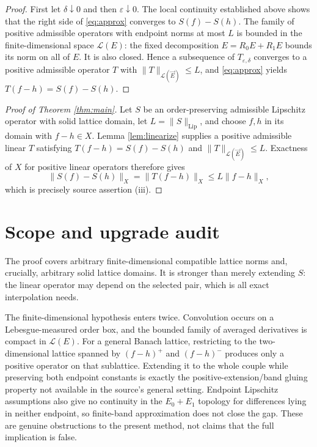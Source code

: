 \documentclass[11pt]{article}
\newcommand{\cL}{\mathcal L}
\begin{document}
\begin{proof}
First let $\delta\downarrow0$ and then $\varepsilon\downarrow0$.  The local
continuity established above shows that the right side of
\eqref{eq:approx} converges to $S(f)-S(h)$.  The family of positive
admissible operators with endpoint norms at most $L$ is bounded in the
finite-dimensional space $\cL(E)$: the fixed decomposition
$E=R_0E+R_1E$ bounds its norm on all of $E$.  It is also closed.  Hence a
subsequence of $T_{\varepsilon,\delta}$ converges to a positive admissible
operator $T$ with $\|T\|_{\cL(\vec E)}\le L$, and \eqref{eq:approx} yields
$T(f-h)=S(f)-S(h)$.
\end{proof}

\begin{proof}[Proof of Theorem \ref{thm:main}]
Let $S$ be an order-preserving admissible Lipschitz operator with solid
lattice domain, let $L=\|S\|_{\mathrm{Lip}}$, and choose $f,h$ in its domain
with $f-h\in X$.  Lemma \ref{lem:linearize} supplies a positive admissible
linear $T$ satisfying $T(f-h)=S(f)-S(h)$ and
$\|T\|_{\cL(\vec E)}\le L$.  Exactness of $X$ for positive linear operators
therefore gives
\[
 \|S(f)-S(h)\|_X
 =\|T(f-h)\|_X
 \le L\|f-h\|_X,
\]
which is precisely source assertion (iii).
\end{proof}

\section{Scope and upgrade audit}

The proof covers arbitrary finite-dimensional compatible lattice norms and,
crucially, arbitrary solid lattice domains.  It is stronger than merely
extending $S$: the linear operator may depend on the selected pair, which is
all exact interpolation needs.

The finite-dimensional hypothesis enters twice.  Convolution occurs on a
Lebesgue-measured order box, and the bounded family of averaged derivatives
is compact in $\cL(E)$.  For a general Banach lattice, restricting to the
two-dimensional lattice spanned by $(f-h)^+$ and $(f-h)^-$ produces only a
positive operator on that sublattice.  Extending it to the whole couple while
preserving both endpoint constants is exactly the positive-extension/band
gluing property not available in the source's general setting.  Endpoint
Lipschitz assumptions also give no continuity in the $E_0+E_1$ topology for
differences lying in neither endpoint, so finite-band approximation does not
close the gap.  These are genuine obstructions to the present method, not
claims that the full implication is false.
\end{document}
